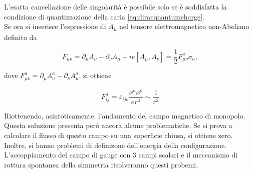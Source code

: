 L'esatta cancellazione delle singolarità è possibile solo se è soddisfatta la condizione
di quantizzazione della caria \ref{eq:diracquantumcharge}.\\

Se ora si inserisce l'espressione di $A _\mu$ nel tensore elettromagnetico non-Abeliano
definito da

\begin{equation}
   F_{\mu\nu} = \partial _\mu A_\nu - \partial _\nu A _\mu + i e [A_\mu,A_\nu]
              = \frac{1}{2} F_{\mu\nu}^a \sigma _a ,
\end{equation}

dove $F_{\mu\nu}^a = \partial _\mu A_\nu^a - \partial _\nu A_\mu^a$, si ottiene

\begin{equation}
   F^a_{ij} = \varepsilon_{ijb} \frac{x^a x^b}{e r^4} \sim \frac{1}{r^2}
\end{equation}

Riottenendo, asintoticamente, l'andamento del campo magnetico di monopolo.\\

Questa soluzione presenta però ancora alcune problematiche. Se si prova a calcolare
il flusso di questo campo su una superficie chiusa, si ottiene zero. Inoltre, si
hanno problemi di definizone dell'energia della configurazione.\\

L'accoppiamento del campo di gauge con 3 campi scalari e il meccanismo di
rottura spontanea della simmetria risolveranno questi probemi.
